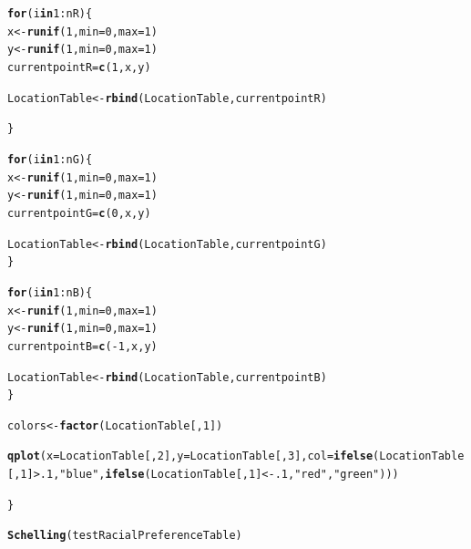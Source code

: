 \documentclass{article}\usepackage[]{graphicx}\usepackage[]{color}
\makeatletter
\newcommand{\hlnum}[1]{\textcolor[rgb]{0.686,0.059,0.569}{#1}}%
\newcommand{\hlstr}[1]{\textcolor[rgb]{0.192,0.494,0.8}{#1}}%
\newcommand{\hlopt}[1]{\textcolor[rgb]{0,0,0}{#1}}%
\newcommand{\hlstd}[1]{\textcolor[rgb]{0.345,0.345,0.345}{#1}}%
\newcommand{\hlkwa}[1]{\textcolor[rgb]{0.161,0.373,0.58}{\textbf{#1}}}%
\newcommand{\hlkwb}[1]{\textcolor[rgb]{0.69,0.353,0.396}{#1}}%
\newcommand{\hlkwc}[1]{\textcolor[rgb]{0.333,0.667,0.333}{#1}}%
\newcommand{\hlkwd}[1]{\textcolor[rgb]{0.737,0.353,0.396}{\textbf{#1}}}%
\newenvironment{kframe}{%
 \def\at@end@of@kframe{}%
 \ifinner\ifhmode%
  \def\at@end@of@kframe{\end{minipage}}%
  \begin{minipage}{\columnwidth}%
 \fi\fi%
 \def\FrameCommand##1{\hskip\@totalleftmargin \hskip-\fboxsep
 \colorbox{shadecolor}{##1}\hskip-\fboxsep
     \hskip-\linewidth \hskip-\@totalleftmargin \hskip\columnwidth}%
 \MakeFramed {\advance\hsize-\width
   \@totalleftmargin\z@ \linewidth\hsize
   \@setminipage}}%
 {\par\unskip\endMakeFramed%
 \at@end@of@kframe}
\newenvironment{knitrout}{}{} %
\makeatother
\begin{document}
\begin{knitrout}
\begin{kframe}
\begin{alltt}
  \hlkwa{for} \hlstd{(i} \hlkwa{in} \hlnum{1}\hlopt{:}\hlstd{nR)\{}
    \hlstd{x} \hlkwb{<-} \hlkwd{runif}\hlstd{(}\hlnum{1}\hlstd{,} \hlkwc{min}\hlstd{=}\hlnum{0}\hlstd{,} \hlkwc{max}\hlstd{=}\hlnum{1}\hlstd{)}
    \hlstd{y} \hlkwb{<-} \hlkwd{runif}\hlstd{(}\hlnum{1}\hlstd{,} \hlkwc{min}\hlstd{=}\hlnum{0}\hlstd{,} \hlkwc{max}\hlstd{=}\hlnum{1}\hlstd{)}
    \hlstd{currentpointR} \hlkwb{=} \hlkwd{c}\hlstd{(}\hlnum{1}\hlstd{,x,y)}

    \hlstd{LocationTable} \hlkwb{<-} \hlkwd{rbind}\hlstd{(LocationTable, currentpointR)}

  \hlstd{\}}

  \hlkwa{for} \hlstd{(i} \hlkwa{in} \hlnum{1}\hlopt{:}\hlstd{nG)\{}
    \hlstd{x} \hlkwb{<-} \hlkwd{runif}\hlstd{(}\hlnum{1}\hlstd{,} \hlkwc{min}\hlstd{=}\hlnum{0}\hlstd{,} \hlkwc{max}\hlstd{=}\hlnum{1}\hlstd{)}
    \hlstd{y} \hlkwb{<-} \hlkwd{runif}\hlstd{(}\hlnum{1}\hlstd{,} \hlkwc{min}\hlstd{=}\hlnum{0}\hlstd{,} \hlkwc{max}\hlstd{=}\hlnum{1}\hlstd{)}
    \hlstd{currentpointG} \hlkwb{=} \hlkwd{c}\hlstd{(}\hlnum{0}\hlstd{,x,y)}

    \hlstd{LocationTable} \hlkwb{<-} \hlkwd{rbind}\hlstd{(LocationTable, currentpointG)}
  \hlstd{\}}

  \hlkwa{for} \hlstd{(i} \hlkwa{in} \hlnum{1}\hlopt{:}\hlstd{nB)\{}
    \hlstd{x} \hlkwb{<-} \hlkwd{runif}\hlstd{(}\hlnum{1}\hlstd{,} \hlkwc{min}\hlstd{=}\hlnum{0}\hlstd{,} \hlkwc{max}\hlstd{=}\hlnum{1}\hlstd{)}
    \hlstd{y} \hlkwb{<-} \hlkwd{runif}\hlstd{(}\hlnum{1}\hlstd{,} \hlkwc{min}\hlstd{=}\hlnum{0}\hlstd{,} \hlkwc{max}\hlstd{=}\hlnum{1}\hlstd{)}
    \hlstd{currentpointB} \hlkwb{=} \hlkwd{c}\hlstd{(}\hlopt{-}\hlnum{1}\hlstd{,x,y)}

    \hlstd{LocationTable} \hlkwb{<-} \hlkwd{rbind}\hlstd{(LocationTable, currentpointB)}
  \hlstd{\}}

  \hlstd{colors} \hlkwb{<-} \hlkwd{factor}\hlstd{(LocationTable[,}\hlnum{1}\hlstd{])}

  \hlkwd{qplot}\hlstd{(}\hlkwc{x} \hlstd{= LocationTable[,}\hlnum{2}\hlstd{],} \hlkwc{y} \hlstd{= LocationTable [,}\hlnum{3}\hlstd{],} \hlkwc{col} \hlstd{=} \hlkwd{ifelse}\hlstd{(LocationTable[,}\hlnum{1}\hlstd{]} \hlopt{>} \hlnum{.1}\hlstd{,} \hlstr{"blue"}\hlstd{,} \hlkwd{ifelse}\hlstd{(LocationTable[,}\hlnum{1}\hlstd{]} \hlopt{< -}\hlnum{.1}\hlstd{,} \hlstr{"red"}\hlstd{,} \hlstr{"green"}\hlstd{)))}


\hlstd{\}}

\hlkwd{Schelling}\hlstd{(testRacialPreferenceTable)}
\end{alltt}



\end{kframe}
\end{knitrout}
\end{document}
